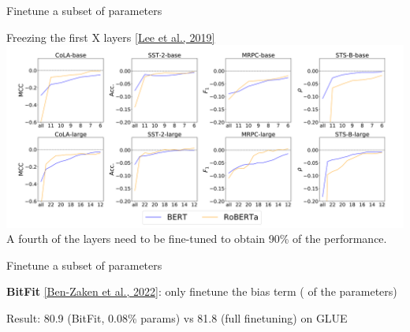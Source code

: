 \documentclass[usenames,dvipsnames,notes,11pt,aspectratio=169,hyperref={colorlinks=true, linkcolor=blue}]{beamer}
\begin{document}
\begin{frame}
    {Finetune a subset of parameters}

    Freezing the first X layers \href{https://arxiv.org/pdf/1911.03090.pdf}{[Lee et al., 2019]} \\[1ex]

    \includegraphics[width=\textwidth]{figures/layer-freezing}\\

    A fourth of the layers need to be fine-tuned to obtain 90\% of the performance.
\end{frame}

\begin{frame}
    {Finetune a subset of parameters}

    \textbf{BitFit} \href{https://arxiv.org/pdf/2106.10199.pdf}{[Ben-Zaken et al., 2022]}: only finetune the bias term ( of the parameters) \\[1em]


    \medskip
    Result: 80.9 (BitFit, 0.08\% params) vs 81.8 (full finetuning) on GLUE
\end{frame}
\end{document}
